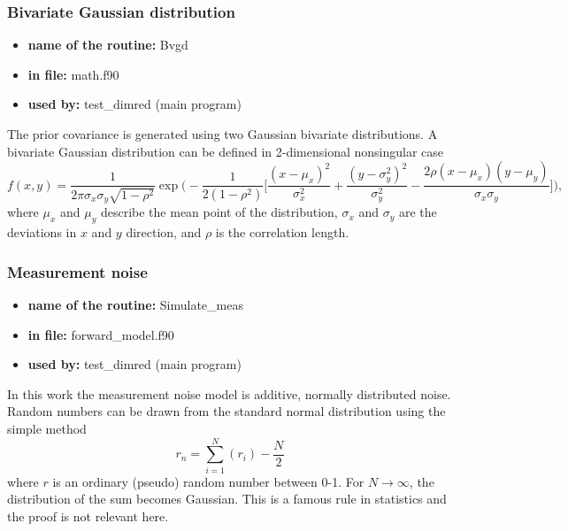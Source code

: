 \documentclass[12pt,a4paper]{article}
\begin{document}
\subsubsection{Bivariate Gaussian distribution}
\begin{itemize}
 \item \textbf{name of the routine:} Bvgd
 \item \textbf{in file:} math.f90
 \item \textbf{used by:} test\_dimred (main program)
\end{itemize}
The prior covariance is generated using two Gaussian bivariate distributions. 
A bivariate Gaussian distribution can be defined in 2-dimensional nonsingular case
\begin{equation}
f(x,y)=\frac{1}{2\pi\sigma_x\sigma_y\sqrt{1-\rho^2}}\exp\Bigg(-\frac{1}{2(1-\rho^2)}\bigg[\frac{(x-\mu_x)^2}{\sigma_x^2}+\frac{(y-\sigma_y^2)^2}{\sigma_y^2}-\frac{2\rho(x-\mu_x)(y-\mu_y)}{\sigma_x\sigma_y}\bigg]\Bigg),
\end{equation}
where $\mu_x$ and $\mu_y$ describe the mean point of the distribution, $\sigma_x$ and $\sigma_y$ are the deviations in $x$ and $y$ direction, and $\rho$ is the correlation length.

\subsubsection{Measurement noise}
\begin{itemize}
 \item \textbf{name of the routine:} Simulate\_meas
 \item \textbf{in file:} forward\_model.f90
 \item \textbf{used by:} test\_dimred (main program)
\end{itemize}
In this work the measurement noise model is additive, normally distributed noise. Random numbers 
can be drawn from the standard normal distribution using the simple method
\begin{equation}
r_n=\sum_{i=1}^N(r_i)-\frac{N}{2}
\end{equation}
where $r$ is an ordinary (pseudo) random number between 0-1. For $N\rightarrow \infty$, the 
distribution of the sum becomes Gaussian. This is a famous rule in statistics and the proof
is not relevant here.
\end{document}
